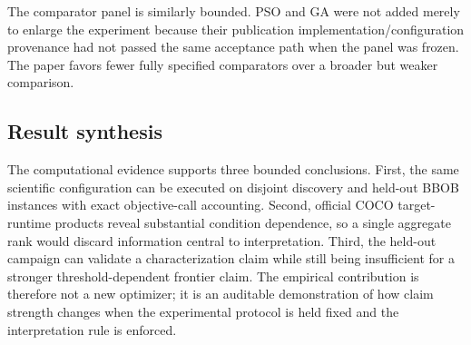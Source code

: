 The comparator panel is similarly bounded. PSO and GA were not added merely to enlarge the experiment because their publication implementation/configuration provenance had not passed the same acceptance path when the panel was frozen. The paper favors fewer fully specified comparators over a broader but weaker comparison.

\subsection{Result synthesis}

The computational evidence supports three bounded conclusions. First, the same scientific configuration can be executed on disjoint discovery and held-out BBOB instances with exact objective-call accounting. Second, official COCO target-runtime products reveal substantial condition dependence, so a single aggregate rank would discard information central to interpretation. Third, the held-out campaign can validate a characterization claim while still being insufficient for a stronger threshold-dependent frontier claim. The empirical contribution is therefore not a new optimizer; it is an auditable demonstration of how claim strength changes when the experimental protocol is held fixed and the interpretation rule is enforced.
